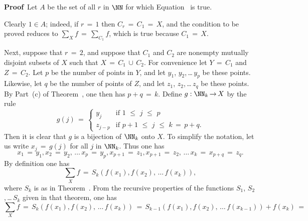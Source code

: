 {\V

        {\bf Proof}\, Let $A$ be the set of all $r$ in ${\NN}$ for which Equation~ is true.

        Clearly $1{\in}A$; indeed, if $r \,=\, 1$ then $C_{r} \,=\, C_{1} \,=\, X$, and the condition to be proved reduces to
    ${\sum}_{X} f \,=\, {\sum}_{C_{1}} f$, which is true because $C_{1} \,=\, X$.

        Next, suppose that $r \,=\, 2$, and suppose that $C_{1}$ and $C_{2}$ are nonempty mutually disjoint subsets of $X$ such that $X \,=\, C_{1}\,{\cup}\,C_{2}$.
    For convenience let $Y \,=\, C_{1}$ and $Z \,=\, C_{2}$.
    Let $p$ be the number of points in $Y$, and let $y_{1}$, $y_{2}$,\,{\ldots}\,$y_{p}$ be these points.
    Likewise, let $q$ be the number of points of $Z$, and let $z_{1}$, $z_{2}$,\,{\ldots}\,$z_{q}$ be these points.
    By Part~(c) of Theorem~, one then has $p+q \,=\, k$.
    Define $g:{\NN}_{k} \,{\rightarrow}\, X$ by the rule
        \begin{displaymath}
        g(j) \,=\,
        \left\{
        \begin{array}{ll}
        y_{j}    & \mbox{if $1\,\,{\leq}\,\,j\,\,{\leq}\,\,p$} \\
        z_{j-p}  & \mbox{if $p+1\,\,{\leq}\,\,j\,\,{\leq}\,\,k$} \,=\, p+q.
        \end{array}
        \right.
        \end{displaymath}
    Then it is clear that $g$ is a bijection of ${\NN}_{k}$ onto $X$.
    To simplify the notation, let us write $x_{j} \,=\, g(j)$ for all $j$ in ${\NN}_{k}$.
    Thus one has
        \begin{displaymath}
        x_{1} \,=\, y_{1}, x_{2} \,=\, y_{2},\,{\ldots}\,x_{p} \,=\, y_{p},x_{p+1} \,=\, z_{1}, x_{p+1} \,=\, z_{2},\,{\ldots}\,x_{k} \,=\, x_{p+q} \,=\, z_{q}.
        \end{displaymath}
    By definition one has
        \begin{displaymath}
        {\sum}_{X} f \,=\, S_{k}(f(x_{1}),f(x_{2}),\,{\ldots}\,f(x_{k})),
        \end{displaymath}
    where $S_{k}$ is as in Theorem~.
    From the recursive properties of the functions $S_{1}$, $S_{2}$,\,{\ldots}\,$S_{k}$ given in that theorem, one has
        \begin{displaymath}
         {\sum}_{X} f \,=\, S_{k}(f(x_{1}),f(x_{2}),\,{\ldots}\,f(x_{k}))\,=\, S_{k-1}(f(x_{1}),f(x_{2}),\,{\ldots}\,f(x_{k-1})) + f(x_{k}) \,=\,

\end{displaymath}}
